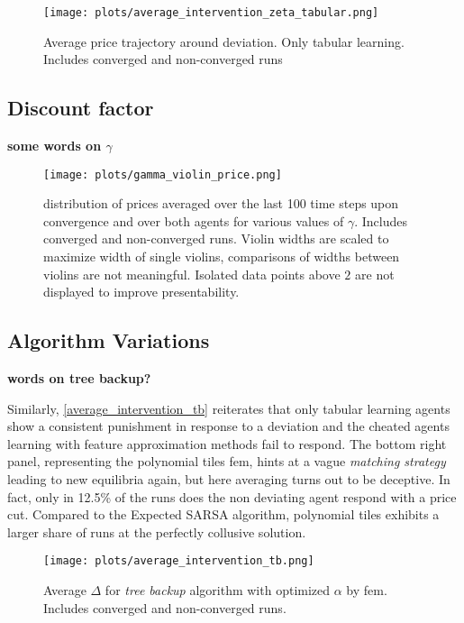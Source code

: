 \begin{figure}
	\texttt{[image: plots/average\_intervention\_zeta\_tabular.png]}
	\caption{Average price trajectory around deviation. Only tabular learning. Includes converged and non-converged runs}
	\label{average_intervention_zeta_tabular}
\end{figure}

\pagebreak
\subsection{Discount factor}\label{discounting_appendix}
\textbf{some words on $\gamma$}

\begin{figure}
	\texttt{[image: plots/gamma\_violin\_price.png]}
	\caption{distribution of prices averaged over the last 100 time steps upon convergence and over both agents for various values of $\gamma$. Includes converged and non-converged runs. Violin widths are scaled to maximize width of single violins, comparisons of widths between violins are not meaningful. Isolated data points above $2$ are not displayed to improve presentability.}
	\label{gamma_violin_price}
\end{figure}



\pagebreak
\subsection{Algorithm Variations}\label{vary_algorithm_appendix}

\textbf{words on tree backup?}

Similarly,  \autoref{average_intervention_tb} reiterates that only tabular learning agents show a consistent punishment in response to a deviation and the cheated agents learning with feature approximation methods fail to respond. The bottom right panel, representing the polynomial tiles \gls{fem}, hints at a vague \emph{matching strategy} leading to new equilibria again, but here averaging turns out to be deceptive. In fact, only in 12.5\% of the runs does the non deviating agent respond with a price cut. Compared to the Expected SARSA algorithm, polynomial tiles exhibits a larger share of runs at the perfectly collusive solution.

\begin{figure}
	\texttt{[image: plots/average\_intervention\_tb.png]}
	\caption[Average $\Delta$ for \emph{tree backup} algorithm with optimized $\alpha$ by \gls{fem}]{Average $\Delta$ for \emph{tree backup} algorithm with optimized $\alpha$ by \gls{fem}. Includes converged and non-converged runs.}
	\label{average_intervention_tb}
\end{figure}



